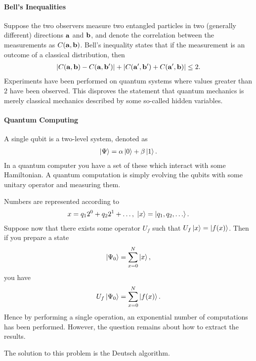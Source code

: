 \paragraph{Bell's Inequalities}
Suppose the two observers measure two entangled particles in two (generally different) directions $\vb{a}$ and $\vb{b}$, and denote the correlation between the measurements as $C(\vb{a}, \vb{b})$. Bell's inequality states that if the measurement is an outcome of a classical distribution, then
\begin{align*}
	\abs{C(\vb{a}, \vb{b}) - C(\vb{a}, \vb{b}^{\prime})} + \abs{C(\vb{a}^{\prime}, \vb{b}^{\prime}) + C(\vb{a}^{\prime}, \vb{b})} \leq 2.
\end{align*}
Experiments have been performed on quantum systems where values greater than $2$ have been observed. This disproves the statement that quantum mechanics is merely classical mechanics described by some so-called hidden variables.

\paragraph{Quantum Computing}
A single qubit is a two-level system, denoted as
\begin{align*}
	\ket{\Psi} = \alpha\ket{0} + \beta\ket{1}.
\end{align*}
In a quantum computer you have a set of these which interact with some Hamiltonian. A quantum computation is simply evolving the qubits with some unitary operator and measuring them.

Numbers are represented according to
\begin{align*}
	x = q_{1}2^{0} + q_{2}2^{1} + \dots,\ \ket{x} = \ket{q_{1}, q_{2}, \dots}.
\end{align*}
Suppose now that there exists some operator $U_{f}$ such that $U_{f}\ket{x} = \ket{f(x)}$. Then if you prepare a state
\begin{align*}
	\ket{\Psi_{0}} = \sum\limits_{x = 0}^{N}\ket{x},
\end{align*}
you have
\begin{align*}
	U_{f}\ket{\Psi_{0}} = \sum\limits_{x = 0}^{N}\ket{f(x)}.
\end{align*}
Hence by performing a single operation, an exponential number of computations has been performed. However, the question remains about how to extract the results.

The solution to this problem is the Deutsch algorithm.